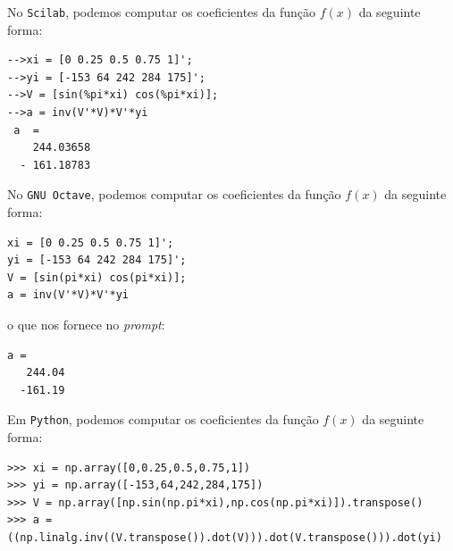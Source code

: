 \begin{sol}
\ifisscilab
No \verb+Scilab+, podemos computar os coeficientes da função $f(x)$ da seguinte forma:
\begin{verbatim}
-->xi = [0 0.25 0.5 0.75 1]';  
-->yi = [-153 64 242 284 175]'; 
-->V = [sin(%pi*xi) cos(%pi*xi)]; 
-->a = inv(V'*V)*V'*yi 
 a  =
    244.03658  
  - 161.18783  
\end{verbatim}
\fi
\ifisoctave
No \verb+GNU Octave+, podemos computar os coeficientes da função $f(x)$ da seguinte forma:
\begin{verbatim}
xi = [0 0.25 0.5 0.75 1]';
yi = [-153 64 242 284 175]';
V = [sin(pi*xi) cos(pi*xi)];
a = inv(V'*V)*V'*yi
\end{verbatim}
o que nos fornece no {\it prompt}:
\begin{verbatim}
a =
   244.04
  -161.19
\end{verbatim}
\fi
\ifispython
Em \verb+Python+, podemos computar os coeficientes da função $f(x)$ da seguinte forma:
\begin{verbatim}
>>> xi = np.array([0,0.25,0.5,0.75,1])
>>> yi = np.array([-153,64,242,284,175])
>>> V = np.array([np.sin(np.pi*xi),np.cos(np.pi*xi)]).transpose()
>>> a = ((np.linalg.inv((V.transpose()).dot(V))).dot(V.transpose())).dot(yi)
\end{verbatim}
\fi

\end{sol}

